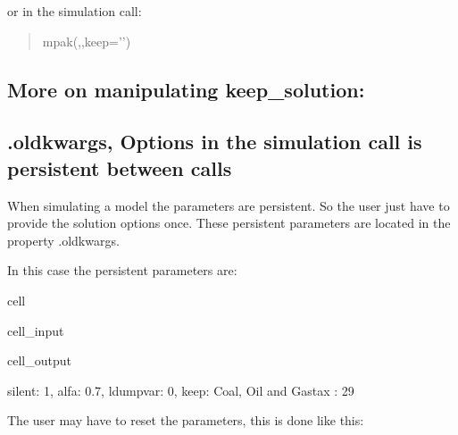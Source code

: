 \documentclass[letterpaper,10pt,english]{jupyterBook}
\begin{document}
\sphinxAtStartPar
or in the simulation call:
\begin{quote}

\sphinxAtStartPar
mpak(,,keep=’’)
\end{quote}


\subsection{More on manipulating keep\_solution:}
\label{\detokenize{content/notebooks/modelflow_features:more-on-manipulating-keep-solution}}
\sphinxAtStartPar
{}


\subsection{.oldkwargs, Options in the simulation call is persistent between calls}
\label{\detokenize{content/notebooks/modelflow_features:oldkwargs-options-in-the-simulation-call-is-persistent-between-calls}}
\sphinxAtStartPar
When simulating a model the parameters are persistent. So the user just have to provide the
solution options once. These persistent parameters are located in the property .oldkwargs.

\sphinxAtStartPar
In this case the persistent parameters are:

\begin{sphinxuseclass}{cell}\begin{sphinxVerbatimInput}

\begin{sphinxuseclass}{cell_input}
\begin{sphinxVerbatim}[commandchars=\\\{\}]
\end{sphinxVerbatim}

\end{sphinxuseclass}\end{sphinxVerbatimInput}
\begin{sphinxVerbatimOutput}

\begin{sphinxuseclass}{cell_output}
\begin{sphinxVerbatim}[commandchars=\\\{\}]
\PYGZob{}\PYGZsq{}silent\PYGZsq{}: 1, \PYGZsq{}alfa\PYGZsq{}: 0.7, \PYGZsq{}ldumpvar\PYGZsq{}: 0, \PYGZsq{}keep\PYGZsq{}: \PYGZsq{}Coal, Oil and Gastax : 29\PYGZsq{}\PYGZcb{}
\end{sphinxVerbatim}

\end{sphinxuseclass}\end{sphinxVerbatimOutput}

\end{sphinxuseclass}
\sphinxAtStartPar
The user may have to reset the parameters, this is done like this:
\end{document}
